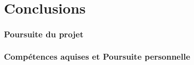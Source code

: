 \section{Conclusions}

\begin{frame}
\frametitle{Poursuite du projet}

\end{frame}


\begin{frame}
\frametitle{Compétences aquises et Poursuite personnelle}

\end{frame}

